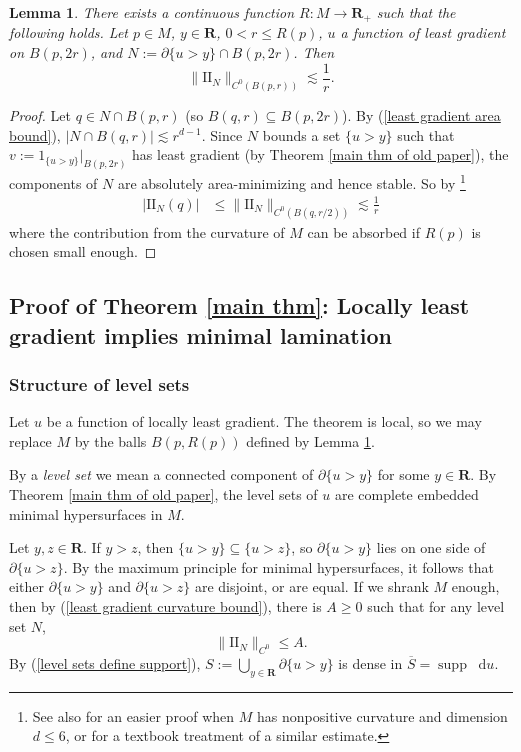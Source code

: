 \documentclass[reqno,11pt]{amsart}
\newcommand{\RR}{\mathbf{R}}
\newcommand*\dif{\mathop{}\!\mathrm{d}}
\DeclareMathOperator{\supp}{supp}
\newcommand{\Two}{\mathrm{I\!I}}
\newcommand{\dfn}[1]{\emph{#1}\index{#1}}
\newtheorem{lemma}[theorem]{Lemma}
\theoremstyle{definition}
\numberwithin{equation}{section}
\begin{document}
\begin{lemma}\label{choose balls for main thm}
There exists a continuous function $R: M \to \RR_+$ such that the following holds.
Let $p \in M$, $y \in \RR$, $0 < r \leq R(p)$, $u$ a function of least gradient on $B(p, 2r)$, and $N := \partial \{u > y\} \cap B(p, 2r)$.
Then
\begin{equation}\label{least gradient curvature bound}
\|\Two_N\|_{C^0(B(p, r))} \lesssim \frac{1}{r}.
\end{equation}
\end{lemma}
\begin{proof}
Let $q \in N \cap B(p, r)$ (so $B(q, r) \subseteq B(p, 2r)$).
By (\ref{least gradient area bound}), $|N \cap B(q, r)| \lesssim r^{d - 1}$.
Since $N$ bounds a set $\{u > y\}$ such that $v := 1_{\{u > y\}}|_{B(p, 2r)}$ has least gradient (by Theorem \ref{main thm of old paper}), the components of $N$ are absolutely area-minimizing and hence stable.
So by \cite[pg785, Corollary 1]{Schoen81}\footnote{See also \cite[Theorem 3]{Schoen75} for an easier proof when $M$ has nonpositive curvature and dimension $d \leq 6$, or \cite[Chapter 2, \S\S4-5]{colding2011course} for a textbook treatment of a similar estimate.}
\begin{align*}
|\Two_N(q)| &\leq \|\Two_N\|_{C^0(B(q, r/2))} \lesssim \frac{1}{r}
\end{align*}
where the contribution from the curvature of $M$ can be absorbed if $R(p)$ is chosen small enough.
\end{proof}

\subsection{Proof of Theorem \texorpdfstring{\ref{main thm}}{B}: Locally least gradient implies minimal lamination}
\subsubsection{Structure of level sets}
Let $u$ be a function of locally least gradient.
The theorem is local, so we may replace $M$ by the balls $B(p, R(p))$ defined by Lemma \ref{choose balls for main thm}. 

By a \dfn{level set} we mean a connected component of $\partial \{u > y\}$ for some $y \in \RR$.
By Theorem \ref{main thm of old paper}, the level sets of $u$ are complete embedded minimal hypersurfaces in $M$.

Let $y, z \in \RR$. If $y > z$, then $\{u > y\} \subseteq \{u > z\}$, so $\partial \{u > y\}$ lies on one side of $\partial \{u > z\}$.
By the maximum principle for minimal hypersurfaces, it follows that either $\partial \{u > y\}$ and $\partial \{u > z\}$ are disjoint, or are equal.
If we shrank $M$ enough, then by (\ref{least gradient curvature bound}), there is $A \geq 0$ such that for any level set $N$,
\begin{equation}\label{curvature bound on level sets}
\|\Two_N\|_{C^0} \leq A.
\end{equation}
By (\ref{level sets define support}), $S := \bigcup_{y \in \RR} \partial \{u > y\}$ is dense in $\overline S = \supp \dif u$.
\end{document}
